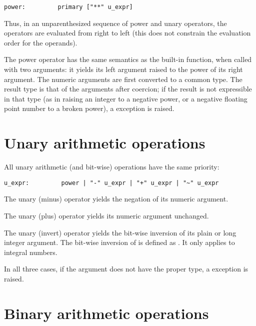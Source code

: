 \begin{verbatim}
power:         primary ["**" u_expr]
\end{verbatim}

Thus, in an unparenthesized sequence of power and unary operators, the
operators are evaluated from right to left (this does not constrain
the evaluation order for the operands).

The power operator has the same semantics as the built-in
 function, when called with two arguments: it yields
its left argument raised to the power of its right argument.  The
numeric arguments are first converted to a common type.  The result
type is that of the arguments after coercion; if the result is not
expressible in that type (as in raising an integer to a negative
power, or a negative floating point number to a broken power), a
 exception is raised.


\section{Unary arithmetic operations \label{unary}}

All unary arithmetic (and bit-wise) operations have the same priority:

\begin{verbatim}
u_expr:         power | "-" u_expr | "+" u_expr | "~" u_expr
\end{verbatim}

The unary \code{-} (minus) operator yields the negation of its
numeric argument.

The unary \code{+} (plus) operator yields its numeric argument
unchanged.

The unary \code{\~} (invert) operator yields the bit-wise inversion
of its plain or long integer argument.  The bit-wise inversion of
 is defined as .  It only applies to integral
numbers.

In all three cases, if the argument does not have the proper type,
a  exception is raised.

\section{Binary arithmetic operations\label{binary}}

